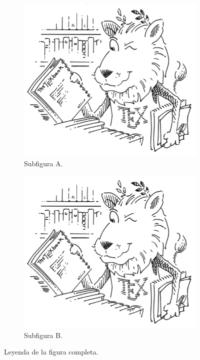 \documentclass[12pt]{article}
\begin{document}
\begin{figure}[h]
	\centering
	\begin{subfigure}[b]{0.45\textwidth}
		\includegraphics[width=\textwidth]{figuras/tex_lion}
		\caption{Subfigura A.\label{fig:subA}}
	\end{subfigure}
	\hfill
	\begin{subfigure}[b]{0.45\textwidth}
		\includegraphics[width=\textwidth]{figuras/tex_lion}
		\caption{Subfigura B.\label{fig:subB}}
	\end{subfigure}
	\caption{Leyenda de la figura completa.\label{fig:completa}}
\end{figure}
\end{document}
